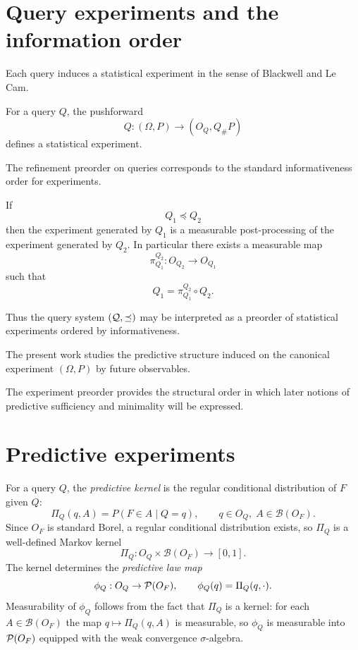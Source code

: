 \bigskip

\section[Query experiments]{Query experiments and the information order}\label{sec:query-experiments}

Each query induces a statistical experiment in the sense of Blackwell and
Le Cam.

\begin{definition}
For a query $Q$, the pushforward
\[
Q:(\Omega,P)\to (O_Q,Q_\#P)
\]
defines a statistical experiment.
\end{definition}

The refinement preorder on queries corresponds to the standard
informativeness order for experiments.

\begin{theorem}
If
\[
Q_1 \preceq Q_2
\]
then the experiment generated by $Q_1$ is a measurable
post-processing of the experiment generated by $Q_2$.  In particular
there exists a measurable map
\[
\pi^{Q_2}_{Q_1}:O_{Q_2}\to O_{Q_1}
\]
such that
\[
Q_1=\pi^{Q_2}_{Q_1}\circ Q_2.
\]
\end{theorem}

Thus the query system $(\mathcal{Q},\preceq)$ may be interpreted as a preorder
of statistical experiments ordered by informativeness.

\begin{remark}
The present work studies the predictive structure induced on the
canonical experiment $(\Omega,P)$ by future observables.
\end{remark}

\begin{remark}
The experiment preorder provides the structural order in which later
notions of predictive sufficiency and minimality will be expressed.
\end{remark}

\bigskip

\section{Predictive experiments}\label{sec:predictive-experiments}

\begin{definition}\label{def:predictive-kernel}
For a query $Q$, the \emph{predictive kernel} is the regular
conditional distribution of $F$ given $Q$:
\[
\Pi_Q(q,A)
=
P(F\in A\mid Q=q),
\qquad
q\in O_Q,\; A\in\mathcal B(O_F).
\]
Since $O_F$ is standard Borel, a regular conditional distribution
exists, so $\Pi_Q$ is a well-defined Markov kernel
\[
\Pi_Q:O_Q\times\mathcal B(O_F)\to[0,1].
\]
The kernel determines the \emph{predictive law map}
\[
\phi_Q:O_Q\to \mathcal{P}(O_F),
\qquad
\phi_Q(q)=\Pi_Q(q,\cdot).
\]
Measurability of $\phi_Q$ follows from the fact that $\Pi_Q$ is a
kernel: for each $A\in\mathcal B(O_F)$ the map $q\mapsto \Pi_Q(q,A)$
is measurable, so $\phi_Q$ is measurable into $\mathcal{P}(O_F)$ equipped
with the weak convergence $\sigma$-algebra.
\end{definition}

